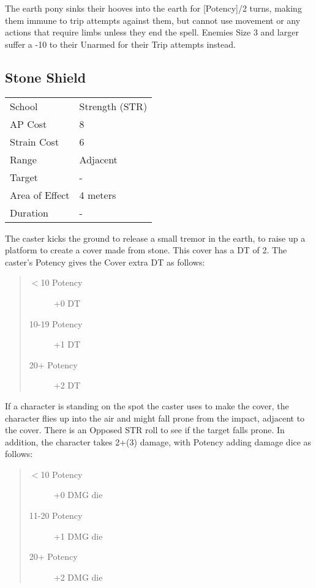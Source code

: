 \documentclass[11pt,a4paper,twocolumn]{book}
\begin{document}
\medskip

The earth pony sinks their hooves into the earth for [Potency]/2 turns, making them immune to trip attempts against them, but cannot use movement or any actions that require limbs unless they end the spell. Enemies Size 3 and larger suffer a -10 to their Unarmed for their Trip attempts instead.

\vfill

\subsection*{Stone Shield}
{
	\begin{tabu} to 75mm{| X[l,4] | X[l,7] |}
		\hline
		School 			& Strength (STR) 	\\
		AP Cost	      	& 8 				\\
		Strain Cost     & 6 				\\
		Range     		& Adjacent 	        \\
		Target      	& - 				\\
		Area of Effect  & 4 meters 	 		\\
		Duration     	& - 				\\ \hline
	\end{tabu}
}

\medskip

The caster kicks the ground to release a small tremor in the earth, to raise up a platform to create a cover made from stone. This cover has a DT of 2. The caster's Potency gives the Cover extra DT as follows:

\begin{quote}
	\begin{description}
		\item[$<$10 Potency] 	+0 DT
		\item[10-19 Potency] 	+1 DT
		\item[20+ Potency] 	    +2 DT
	\end{description}	
\end{quote}

If a character is standing on the spot the caster uses to make the cover, the character flies up into the air and might fall prone from the impact, adjacent to the cover. There is an Opposed STR roll to see if the target falls prone. In addition, the character takes 2+(3) damage, with Potency adding damage dice as follows:

\begin{quote}
	\begin{description}
		\item[$<$10 Potency] 	+0 DMG die
		\item[11-20 Potency] 	+1 DMG die
		\item[20+ Potency] 	    +2 DMG die
	\end{description}	
\end{quote}
\end{document}

